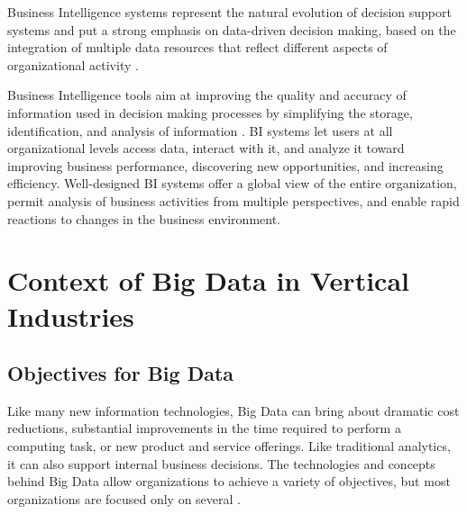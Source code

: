 \documentclass[runningheads]{llncs}
\begin{document}
Business Intelligence systems represent the natural evolution of decision support systems and put a strong emphasis on data-driven decision making, based on the integration of multiple data resources that reflect different aspects of organizational activity \cite{YOGEV}.

Business Intelligence tools aim at improving the quality and accuracy of information used in decision making processes by simplifying the storage, identification, and analysis of information \cite{NEGASH}. BI systems let users at all organizational levels access data, interact with it, and analyze it toward improving business performance, discovering new opportunities, and increasing efficiency. Well-designed BI systems offer a global view of the entire organization, permit analysis of business activities from multiple perspectives, and enable rapid reactions to changes in the business environment.

\section{Context of Big Data in Vertical Industries}
\subsection{Objectives for Big Data}
Like many new information technologies, Big Data can bring about dramatic cost reductions, substantial improvements in the time required to perform a computing task, or new product and service offerings. Like traditional analytics, it can also support internal business decisions. The technologies and concepts behind Big Data allow organizations to achieve a variety of objectives, but most organizations are focused only on several \cite{DAVENPORT}.
\end{document}
